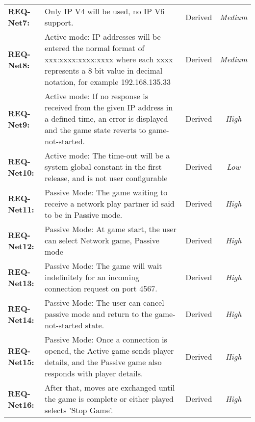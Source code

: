 \documentclass[a4paper,10pt]{article}
\begin{document}
\begin{table}[H]
\begin{tabular}{|| l | p{10.5cm}  |  c  | c ||}
\textbf{REQ-Net7:} &  
Only IP V4 will be used, no IP V6 support.
& Derived  &  \textit{Medium}\\

\textbf{REQ-Net8:} &  
Active mode: IP addresses will be entered the normal format of xxx:xxxx:xxxx:xxxx where each xxxx represents a 8 bit value in decimal notation, for example 192.168.135.33
& Derived  &  \textit{Medium}\\

\textbf{REQ-Net9:} &  
Active mode: If no response is received from the given IP address in a defined time, an error is displayed and the game state reverts to game-not-started. & Derived  &  \textit{High}\\

\textbf{REQ-Net10:} &  
Active mode: The time-out will be a system global constant in the first release, and is not user configurable
& Derived  &  \textit{Low}\\

\textbf{REQ-Net11:} &  
Passive Mode: The game waiting to receive a network play partner id said to be in Passive mode.
& Derived  &  \textit{High}\\


\textbf{REQ-Net12:} &  
Passive Mode: At game start, the user can select Network game, Passive mode
& Derived  &  \textit{High}\\


\textbf{REQ-Net13:} &  
Passive Mode: The game will wait indefinitely for an incoming connection request on port 4567.
& Derived  &  \textit{High}\\


\textbf{REQ-Net14:} &  
Passive Mode: The user can cancel passive mode and return to the game-not-started state.
& Derived  &  \textit{High}\\


\textbf{REQ-Net15:} &  
Passive Mode: Once a connection is opened, the Active game sends player details, and the Passive game also responds with player details.
& Derived  &  \textit{High}\\


\textbf{REQ-Net16:} &  
After that, moves are exchanged until the game is complete or either played selects 'Stop Game'.
 & Derived  &  \textit{High}\\







\hline
\end{tabular}
\end{table}
\end{document}
